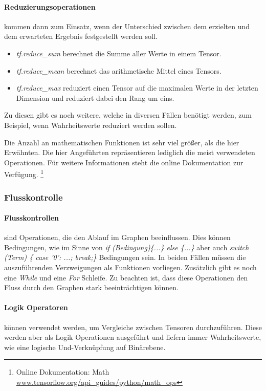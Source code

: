 \paragraph{Reduzierungsoperationen} kommen dann zum Einsatz, wenn der Unterschied zwischen dem erzielten und dem erwarteten Ergebnis festgestellt werden soll. 
\begin{itemize}
	\item \textit{tf.reduce\_sum} berechnet die Summe aller Werte in einem Tensor.
	\item \textit{tf.reduce\_mean} berechnet das arithmetische Mittel eines Tensors. 
	\item \textit{tf.reduce\_max} reduziert einen Tensor auf die maximalen Werte in der letzten Dimension und reduziert dabei den Rang um eins.
\end{itemize}

\noindent
Zu diesen gibt es noch weitere, welche in diversen Fällen benötigt werden, zum Beispiel, wenn Wahrheitswerte reduziert werden sollen. \newline

\noindent
Die Anzahl an mathematischen Funktionen ist sehr viel größer, als die hier Erwähnten. 
Die hier Angeführten repräsentieren lediglich die meist verwendeten Operationen. 
Für weitere Informationen steht die online Dokumentation zur Verfügung. \footnote{Online Dokumentation: Math  \url{www.tensorflow.org/api_guides/python/math_ops}}

\subsubsection{Flusskontrolle}

\paragraph{Flusskontrollen} sind Operationen, die den Ablauf im Graphen beeinflussen. 
Dies können Bedingungen, wie im Sinne von \textit{if (Bedingung)\{...\} else \{...\}} aber auch \textit{switch (Term) \{ case '0': ...; break;\}} Bedingungen sein. 
In beiden Fällen müssen die auszuführenden Verzweigungen als Funktionen vorliegen. 
Zusätzlich gibt es noch eine \textit{While} und eine \textit{For} Schleife. 
Zu beachten ist, dass diese Operationen den Fluss durch den Graphen stark beeinträchtigen können.

\paragraph{Logik Operatoren} können verwendet werden, um Vergleiche zwischen Tensoren durchzuführen. 
Diese werden aber als Logik Operationen ausgeführt und liefern immer Wahrheitswerte, wie eine logische Und-Verknüpfung auf Binärebene.

